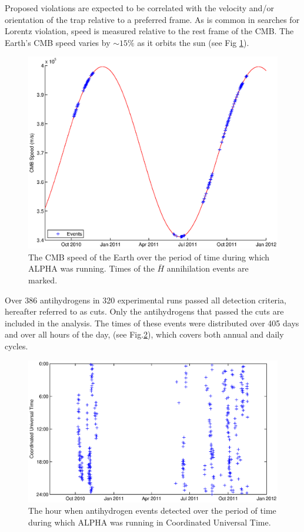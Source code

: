 \documentclass[superscriptaddress,aps,prb,11pt]{revtex4-1}
\begin{document}
Proposed violations are expected to be correlated with the velocity and/or orientation of the trap relative to a preferred frame.  As is common in searches for Lorentz violation, speed is measured relative to the rest frame of the CMB.  The Earth's CMB speed varies by $\sim\!\!15\%$ as it orbits the sun (see Fig \ref{fig:true_event_distribution}).

\begin{figure}
  \includegraphics[scale=0.5]{True_Event_Distribution.eps}
  \caption{The CMB speed of the Earth over the period of time during which ALPHA was running.  Times of the $\bar{H}$ annihilation events are marked.}
  \label{fig:true_event_distribution}
\end{figure}

Over 386 antihydrogens in 320 experimental runs passed all detection criteria, hereafter referred to as cuts\cite{amol:14a}.  Only the antihydrogens that passed the cuts are included in the analysis.  The times of these events were distributed over 405 days and over all hours of the day, (see Fig.\ref{fig:eventTime_date_experiment}), which covers both annual and daily cycles.

\begin{figure}
  \includegraphics[scale=0.6]{eventTime_date_experiment.eps}
  \caption{The hour when antihydrogen events detected over the period of time during which ALPHA was running in Coordinated Universal Time.}
  \label{fig:eventTime_date_experiment}
\end{figure}
\end{document}
